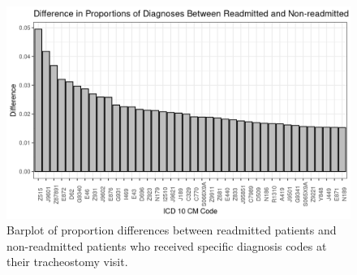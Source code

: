 \documentclass[sn-basic,pdflatex]{sn-jnl}
\theoremstyle{remark}
\theoremstyle{definition}
\begin{document}
\begin{appendices}
\begin{figure}[H]

{\centering \includegraphics[width=1\linewidth]{figures/diffs} 

}

\caption{Barplot of proportion differences between readmitted patients and non-readmitted patients who received specific diagnosis codes at their tracheostomy visit.}\label{fig:diffs}
\end{figure}

\end{appendices}


\end{document}
